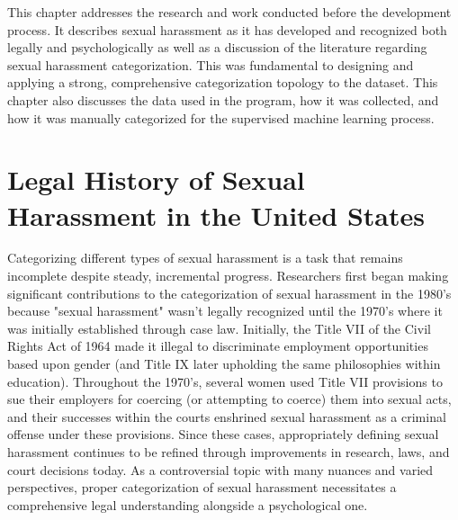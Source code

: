 This chapter addresses the research and work conducted before the development process. It describes sexual harassment as it has developed and recognized both legally and psychologically as well as a discussion of the literature regarding sexual harassment categorization. This was fundamental to designing and applying a strong, comprehensive categorization topology to the dataset. This chapter also discusses the data used in the program, how it was collected, and how it was manually categorized for the supervised machine learning process.

\section{Legal History of Sexual Harassment in the United States}
Categorizing different types of sexual harassment is a task that remains incomplete despite steady, incremental progress. Researchers first began making significant contributions to the categorization of sexual harassment in the 1980's because "sexual harassment" wasn't legally recognized until the 1970's where it was initially established through case law. Initially, the Title VII of the Civil Rights Act of 1964 made it illegal to discriminate employment opportunities based upon gender (and Title IX later upholding the same philosophies within education). Throughout the 1970's, several women used Title VII provisions to sue their employers for coercing (or attempting to coerce) them into sexual acts, and their successes within the courts enshrined sexual harassment as a criminal offense under these provisions. Since these cases, appropriately defining sexual harassment continues to be refined through improvements in research, laws, and court decisions today. As a controversial topic with many nuances and varied perspectives, proper categorization of sexual harassment necessitates a comprehensive legal understanding alongside a psychological one.

